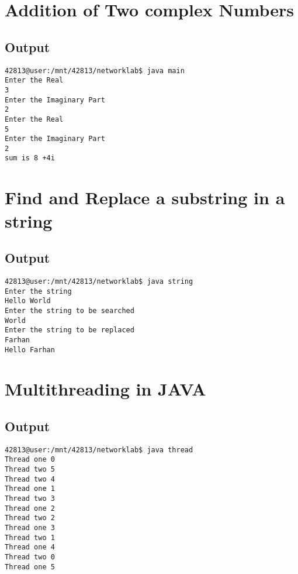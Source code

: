 \documentclass[pdftex,12pt,a4paper]{report}
\begin{document}
\section*{Addition of Two complex Numbers}

\subsection*{Output}
\begin{lstlisting}
42813@user:/mnt/42813/networklab$ java main 
Enter the Real
3
Enter the Imaginary Part
2
Enter the Real
5
Enter the Imaginary Part
2
sum is 8 +4i
\end{lstlisting}



\newpage
\section*{Find and Replace a substring in a string}

\subsection*{Output}
\begin{lstlisting}
42813@user:/mnt/42813/networklab$ java string 
Enter the string
Hello World
Enter the string to be searched
World
Enter the string to be replaced
Farhan
Hello Farhan
\end{lstlisting}


\newpage
\section*{Multithreading in JAVA}

\subsection*{Output}
\begin{lstlisting}
42813@user:/mnt/42813/networklab$ java thread 
Thread one 0
Thread two 5
Thread two 4
Thread one 1
Thread two 3
Thread one 2
Thread two 2
Thread one 3
Thread two 1
Thread one 4
Thread two 0
Thread one 5
\end{lstlisting}
\end{document}
